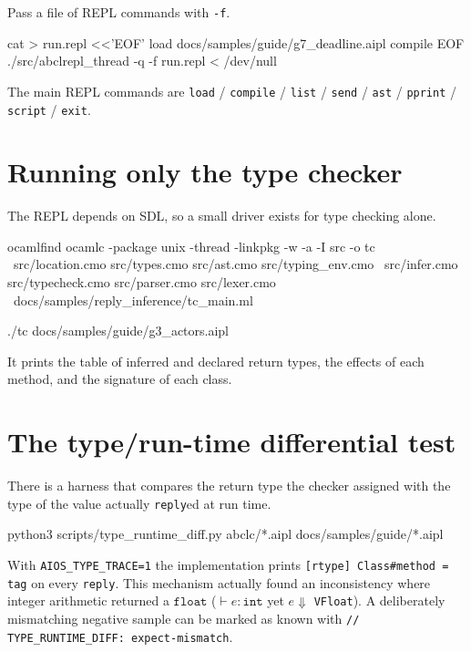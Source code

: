 \documentclass[11pt,a4paper]{article}
\newcommand{\ty}[1]{\ensuremath{\mathtt{#1}}}
\begin{document}
Pass a file of REPL commands with \texttt{-f}.

\begin{term}
cat > run.repl <<'EOF'
load docs/samples/guide/g7_deadline.aipl
compile
EOF
./src/abclrepl_thread -q -f run.repl < /dev/null
\end{term}

The main REPL commands are
\texttt{load} / \texttt{compile} / \texttt{list} / \texttt{send} /
\texttt{ast} / \texttt{pprint} / \texttt{script} / \texttt{exit}.

\section{Running only the type checker}
\label{sec:tc}

The REPL depends on SDL, so a small driver exists for type checking alone.

\begin{term}
ocamlfind ocamlc -package unix -thread -linkpkg -w -a -I src -o tc \
  src/location.cmo src/types.cmo src/ast.cmo src/typing_env.cmo \
  src/infer.cmo src/typecheck.cmo src/parser.cmo src/lexer.cmo \
  docs/samples/reply_inference/tc_main.ml

./tc docs/samples/guide/g3_actors.aipl
\end{term}

It prints the table of inferred and declared return types, the effects of each
method, and the signature of each class.

\section{The type/run-time differential test}

There is a harness that compares the return type the checker assigned with the
type of the value actually \texttt{reply}ed at run time.

\begin{term}
python3 scripts/type_runtime_diff.py abclc/*.aipl docs/samples/guide/*.aipl
\end{term}

With \texttt{AIOS\_TYPE\_TRACE=1} the implementation prints
\texttt{[rtype] Class\#method = tag} on every \texttt{reply}. This mechanism
actually found an inconsistency where integer arithmetic returned a \ty{float}
($\vdash e : \ty{int}$ yet $e \Downarrow$ \texttt{VFloat}).
A deliberately mismatching negative sample can be marked as known with
\texttt{// TYPE\_RUNTIME\_DIFF: expect-mismatch}.
\end{document}
